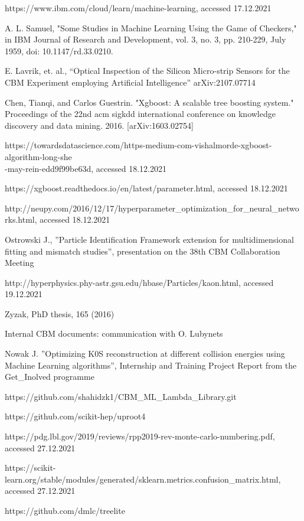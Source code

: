 \begin{thebibliography}{99}
    https://www.ibm.com/cloud/learn/machine-learning, accessed 17.12.2021
    
    A. L. Samuel, "Some Studies in Machine Learning Using the Game of Checkers," in IBM Journal of Research and Development, vol. 3, no. 3, pp. 210-229, July 1959, doi: 10.1147/rd.33.0210.
    
    
    E. Lavrik, et. al., “Optical Inspection of the Silicon Micro-strip Sensors for the CBM Experiment employing Artificial Intelligence''
    arXiv:2107.07714
    
    Chen, Tianqi, and Carlos Guestrin. "Xgboost: A scalable tree boosting system." Proceedings of the 22nd acm sigkdd international conference on knowledge discovery and data mining. 2016.
    [arXiv:1603.02754]
    
    https://towardsdatascience.com/https-medium-com-vishalmorde-xgboost-algorithm-long-she\\-may-rein-edd9f99be63d, accessed 18.12.2021
    
    https://xgboost.readthedocs.io/en/latest/parameter.html, accessed 18.12.2021
    
    http://neupy.com/2016/12/17/hyperparameter\_optimization\_for\_neural\_networks.html, accessed 18.12.2021
    
    Ostrowski J., ''Particle Identification Framework extension for multidimensional fitting and mismatch studies'', presentation on the 38th CBM Collaboration Meeting
    
    http://hyperphysics.phy-astr.gsu.edu/hbase/Particles/kaon.html, accessed 19.12.2021
    
    Zyzak, PhD thesis, 165 (2016)
    
    Internal CBM documents: communication with O. Lubynets
    
    Nowak J. ''Optimizing K0S reconstruction at different collision energies using Machine Learning algorithms'', Internship and Training Project Report from the Get\_Inolved programme
    
    https://github.com/shahidzk1/CBM\_ML\_Lambda\_Library.git
    
    https://github.com/scikit-hep/uproot4
    
    https://pdg.lbl.gov/2019/reviews/rpp2019-rev-monte-carlo-numbering.pdf, accessed 27.12.2021
    
     https://scikit-learn.org/stable/modules/generated/sklearn.metrics.confusion\_matrix.html, accessed 27.12.2021
    
    https://github.com/dmlc/treelite
    

 


\end{thebibliography}